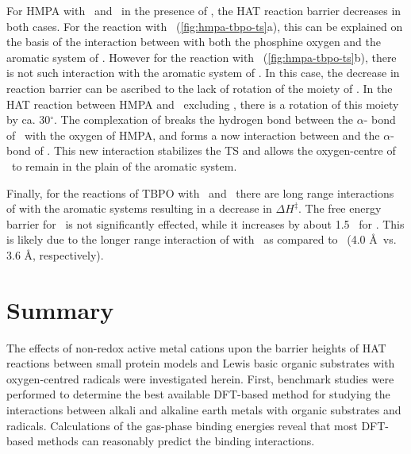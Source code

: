 For HMPA with \cumo\ and \bno\ in the presence of , the HAT reaction
barrier decreases in both cases. For the reaction with \cumo\
(\ref{fig:hmpa-tbpo-ts}a), this can be explained on the basis of the
interaction between \ch{Na^+} with both the phosphine oxygen and the aromatic
system of \cumo. However for the reaction with \bno\ (\ref{fig:hmpa-tbpo-ts}b),
there is not such interaction with the aromatic system of \bno. In this case,
the decrease in reaction barrier can be ascribed to the lack of rotation of the
\ch{CH2O^.} moiety of \bno. In the HAT reaction between HMPA and \bno\
excluding , there is a rotation of this moiety by ca. 30$^\circ$. The
complexation of \ch{NaCl} breaks the hydrogen bond between the
$\alpha$- bond of \bno\ with the oxygen of HMPA, and forms a now
interaction between \ch{Cl^-} and the $\alpha$-\ch{C-H} bond of \bno. This new
interaction stabilizes the TS and allows the oxygen-centre of \bno\ to remain
in the plain of the aromatic system.

Finally, for the reactions of TBPO with \cumo\ and \bno\ there are long range
interactions of  with the aromatic systems resulting in a decrease in
$\Delta H^\ddagger$. The free energy barrier for \cumo\ is not significantly
effected, while it increases by about 1.5 \kcalmol\ for \bno. This is likely
due to the longer range interaction of \ch{Na^+} with \cumo\ as compared to
\bno\ (4.0 \AA\ vs. 3.6 \AA, respectively).

\section{Summary}

The effects of non-redox active metal cations upon the barrier heights of HAT
reactions between small protein models and Lewis basic organic substrates with
oxygen-centred radicals were investigated herein. First, benchmark studies were
performed to determine the best available DFT-based method for studying the
interactions between alkali and alkaline earth metals with organic substrates
and radicals. Calculations of the gas-phase binding energies reveal that most
DFT-based methods can reasonably predict the binding interactions.

